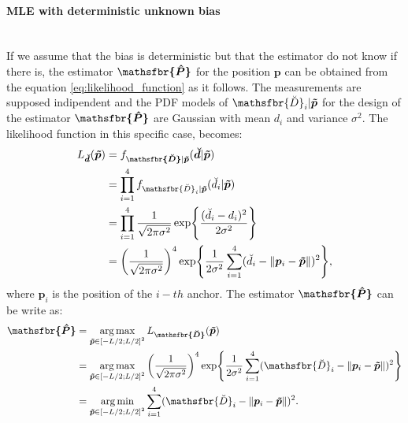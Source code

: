 \documentclass[%
    twoside, 
    a4paper
    ]{article}
\DeclareMathOperator*{\argmax}{arg\,max}
\DeclareMathOperator*{\argmin}{arg\,min}
\DeclareRobustCommand{\msf}[1]{%
  \ifcat\noexpand#1\relax\msfgreek{#1}\else\mathsfbr{#1}\fi%
}
\begin{document}
    \paragraph{MLE with deterministic unknown bias} \mbox{} \\
    If we assume that the bias is deterministic but that the estimator do not know if there is, the estimator 
    $\bm{\msf{\hat{P}}} $ for the position $\bm{p}$ can be obtained from the equation 
    \ref{eq:likelihood_function} as it follows.
    The measurements are supposed indipendent and the PDF models of $\msf{\breve{D}}_i|\bm{\tilde{p}}$ for the 
    design of the estimator $\bm{\msf{\hat{P}}} $ 
    are Gaussian with mean $d_i$ and variance $\sigma^2$.
    The likelihood function in this specific case, becomes:
    \begin{subequations}
        \begin{align}
            L_{\bm{\breve{d}}}(\bm{\tilde{p}}) &= f_{\bm{\msf{\breve{D}}}|\bm{\tilde{p}}}(\bm{\breve{d}}|\bm{\tilde{p}}) \\
            &= \prod_{i=1}^{4} f_{\msf{\breve{D}}_i|\bm{\tilde{p}}}(\breve{d}_i|\bm{\tilde{p}}) \\
            &= \prod_{i=1}^{4} \frac{1}{\sqrt{2 \pi \sigma^2}} \exp{\frac{(\breve{d}_i - d_i)^2}{2 \sigma^2}} \\
            &= \left( \frac{1}{\sqrt{2 \pi \sigma^2}} \right)^4 \exp{\frac{1}{2 \sigma^2} \sum_{i=1}^4 (\breve{d}_i - \lVert \bm{p}_i - \bm{\tilde{p}} \rVert)^2},
        \end{align}
    \end{subequations}
    where $\bm{p}_i$ is the position of the $i-th$ anchor.
    The estimator $\bm{\msf{\hat{P}}} $ can be write as:
    \begin{subequations}
        \begin{align}
            \bm{\msf{\hat{P}}} &= \argmax_{\bm{\tilde{p}} \in \left[-L/2;L/2\right]^2} L_{\bm{\msf{\breve{D}}}}(\bm{\tilde{p}}) \\
            &= \argmax_{\bm{\tilde{p}} \in \left[-L/2;L/2\right]^2} \left( \frac{1}{\sqrt{2 \pi \sigma^2}} \right)^4 \exp{\frac{1}{2 \sigma^2} \sum_{i=1}^4 (\msf{\breve{D}}_i - \lVert \bm{p}_i - \bm{\tilde{p}} \rVert)^2} \\
            &= \argmin_{\bm{\tilde{p}} \in \left[-L/2;L/2\right]^2} \sum_{i=1}^4 (\msf{\breve{D}}_i - \lVert \bm{p}_i - \bm{\tilde{p}} \rVert)^2.
        \end{align}
        \label{eq:MLE_position}
    \end{subequations}
\end{document}

